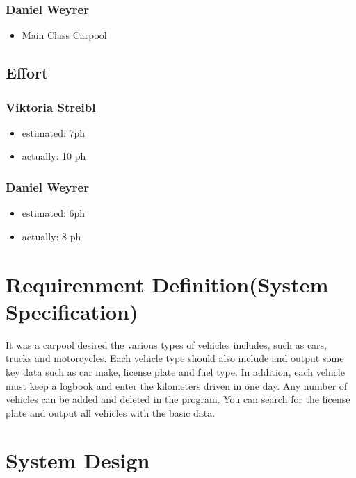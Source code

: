 \subsubsection{Daniel Weyrer}
\begin{itemize}
	\item Main Class Carpool
\end{itemize}

\subsection{Effort}

\subsubsection {Viktoria Streibl}
\begin{itemize}
	\item estimated: 7ph 
	\item actually: 10 ph
\end{itemize}

\subsubsection {Daniel Weyrer}
\begin{itemize}
	\item estimated: 6ph 
	\item actually: 8 ph
\end{itemize}

\section{Requirenment Definition(System Specification)}
It was a carpool desired the various types of vehicles includes, such as cars, trucks and motorcycles. Each vehicle type should also include and output some key data such as car make, license plate and fuel type. In addition, each vehicle must keep a logbook and enter the kilometers driven in one day.
Any number of vehicles can be added and deleted in the program. You can search for the license plate and output all vehicles with the basic data.

\section{System Design}
